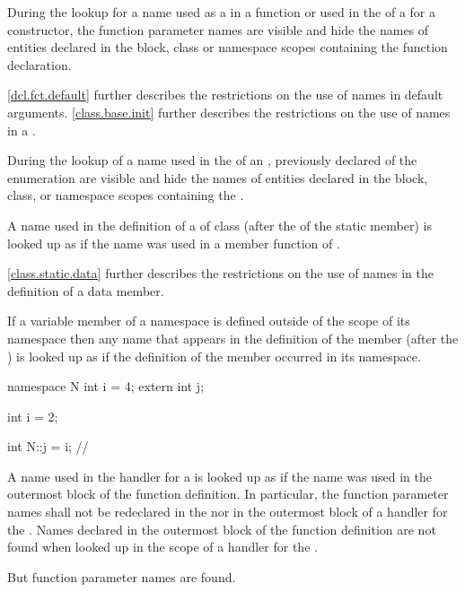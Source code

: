 \pnum
During the lookup for a name used as a  in a function
 or used in the
 of a  for a
constructor, the function parameter names are
visible and hide the names of entities declared in the block, class or
namespace scopes containing the function declaration.
\begin{note}
\ref{dcl.fct.default} further describes the restrictions on the use of
names in default arguments. \ref{class.base.init} further describes the
restrictions on the use of names in a .
\end{note}

\pnum
During the lookup of a name used in the
 of an ,
previously declared  of the enumeration are visible
and hide the names of entities declared in the block, class, or namespace
scopes containing the .

\pnum
A name used in the definition of a 
of class  (after the 
of the static member) is looked up as if the name was used in a member
function of .
\begin{note}
\ref{class.static.data} further
describes the restrictions on the use of names in the definition of a
 data member.
\end{note}

\pnum
If a variable member of a namespace is defined outside of the scope of
its namespace then any name that appears in the definition of the
member (after the ) is looked up as if the
definition of the member occurred in its namespace.
\begin{example}
\begin{codeblock}
namespace N {
  int i = 4;
  extern int j;
}

int i = 2;

int N::j = i;       // 
\end{codeblock}
\end{example}

\pnum
A name used in the handler for a 
is looked up as if the name was used in the
outermost block of the function definition. In particular, the function
parameter names shall not be redeclared in the
 nor in the outermost block of a handler
for the . Names declared in the outermost
block of the function definition are not found when looked up in the
scope of a handler for the .
\begin{note}
But
function parameter names are found.
\end{note}

